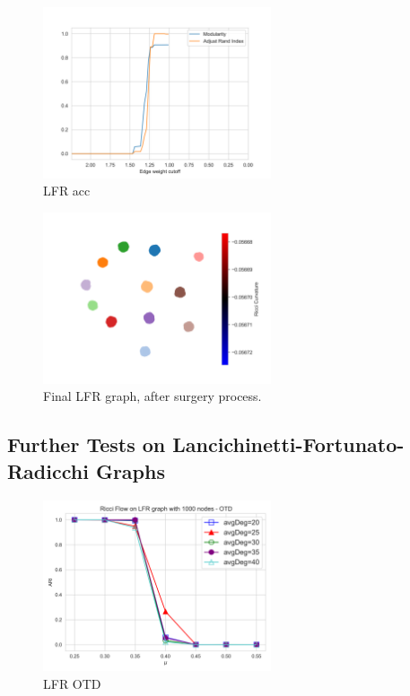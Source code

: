 \begin{figure}
    \centering
    \includegraphics[width=0.6\textwidth]{../tests/ToyModelResults/LFR/Surgery Accuracy.png}
    \caption{LFR acc}
\end{figure}
\label{fig:LFR_Accuracy}

\begin{figure}
    \centering
    \includegraphics[width=0.6\textwidth]{../tests/ToyModelResults/LFR/After Surgery.png}
        \caption{Final LFR graph, after surgery process.}
\end{figure}
\label{fig:LFR_Surgery}

\subsection{Further Tests on Lancichinetti-Fortunato-Radicchi Graphs}

\begin{figure}
    \centering
    \includegraphics[width=0.6\textwidth]{../tests/LFRResults/LFR_OTD.png}
    \caption{LFR OTD}
\end{figure}
\label{fig:LFR_OTD}

